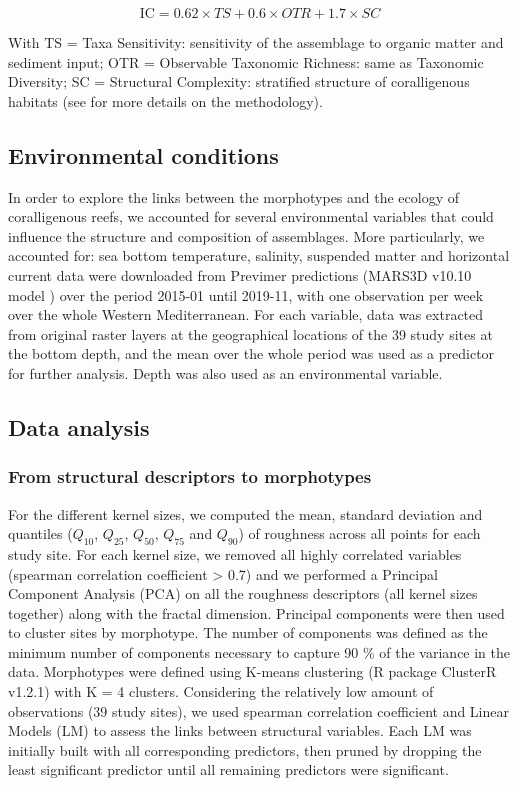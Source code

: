 \begin{itemize}
    \begin{equation}
    \text{IC}=0.62\times TS + 0.6\times OTR + 1.7\times SC
    \label{eq4.3}
    \end{equation}

    With TS = Taxa Sensitivity: sensitivity of the assemblage to organic matter and sediment input; OTR = Observable Taxonomic Richness: same as Taxonomic Diversity; SC = Structural Complexity: stratified structure of coralligenous habitats (see \citet{sartoretto_integrated_2017} for more details on the methodology).
    
\end{itemize}


\subsection{Environmental conditions}\label{chapitre4_2.4}
In order to explore the links between the morphotypes and the ecology of coralligenous reefs, we accounted for several environmental variables that could influence the structure and composition of assemblages. More particularly, we accounted for: sea bottom temperature, salinity, suspended matter and horizontal current data were downloaded from Previmer predictions (MARS3D v10.10 model \citep{ifremer_mars_2019}) over the period 2015-01 until 2019-11, with one observation per week over the whole Western Mediterranean. For each variable, data was extracted from original raster layers at the geographical locations of the 39 study sites at the bottom depth, and the mean over the whole period was used as a predictor for further analysis. Depth was also used as an environmental variable.

\subsection{Data analysis}\label{chapitre4_2.5}

\subsubsection{From structural descriptors to morphotypes }\label{chapitre4_2.5.1}
For the different kernel sizes, we computed the mean, standard deviation and quantiles ($Q_{10}$, $Q_{25}$, $Q_{50}$, $Q_{75}$ and $Q_{90}$) of roughness across all points for each study site. For each kernel size, we removed all highly correlated variables (spearman correlation coefficient > 0.7) and we performed a Principal Component Analysis (PCA) on all the roughness descriptors (all kernel sizes together) along with the fractal dimension. Principal components were then used to cluster sites by morphotype. The number of components was defined as the minimum number of components necessary to capture 90 \% of the variance in the data. Morphotypes were defined using K-means clustering (R package ClusterR v1.2.1) with K = 4 clusters. Considering the relatively low amount of observations (39 study sites), we used spearman correlation coefficient and Linear Models (LM) to assess the links between structural variables. Each LM was initially built with all corresponding predictors, then pruned by dropping the least significant predictor until all remaining predictors were significant.


